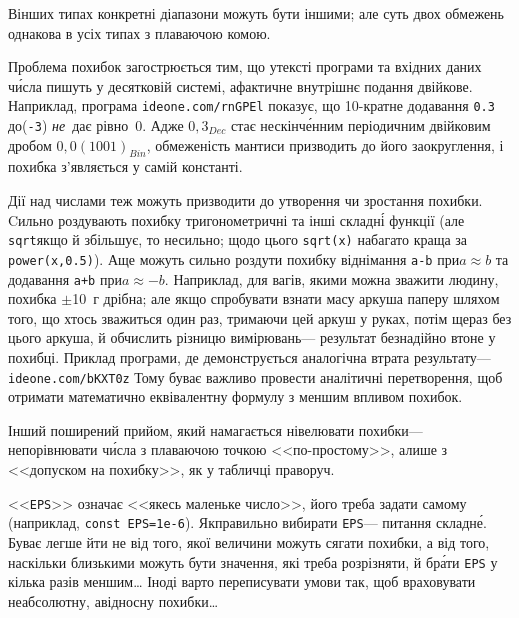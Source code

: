 В\nolinebreak[3] інших типах конкретні діапазони можуть бути іншими; але суть двох обмежень однакова в усіх типах з плаваючою комою. 

Проблема похибок загострюється тим, що у\nolinebreak[3] тексті програми та вхідних даних ч\'{и}сла пишуть у десятковій системі, а\nolinebreak[2] фактичне внутрішнє подання двійкове. 
Наприклад, програма \verb"ideone.com/rnGPEl" показує, що 10-\nolinebreak[2]кратне додавання \texttt{0.3} до\nolinebreak[2] (\texttt{-3}) \emph{не}~дає рівно~0. Адже $0{,}3_{Dec}$ стає нескін\-ч\'{е}н\-ним періодичним двійковим дробом $0{,}0(1001)_{Bin}$, обмеженість мантиси призводить до його заокруглення, і похибка з'являється у самій константі.\label{text:floating-point-error-in-0.3}

Дії над числами теж можуть призводити до утворення чи зростання похибки. Cильно роздувають похибку тригонометричні та інші складн\'{і} функції (але \verb"sqrt"\nolinebreak[1] якщо й збільшує, то не\nolinebreak[3] сильно; щодо цього \verb"sqrt(x)" набагато краща за \verb"power(x,0.5)"). А\nolinebreak[3] ще можуть сильно роздути похибку віднімання \verb"a-b" при\nolinebreak[2] ${a{\approx}b}$ та додавання \verb"a+b" при\nolinebreak[3] ${a{\approx}{-}b}$. Наприклад, для вагів, якими можна зважити людину, похибка $\pm$10~г дрібна; але якщо спробувати взнати масу аркуша паперу шляхом того, що хтось зважиться один раз, тримаючи цей аркуш у руках, потім ще\nolinebreak[3] раз без цього аркуша, й обчислить різницю вимірювань\nolinebreak[3] --- результат безнадійно втоне у похибці.
Приклад програми, де демонструється аналогічна втрата результату\nolinebreak[3] --- \verb"ideone.com/bKXT0z"\hspace{0.5em plus 1em}
Тому буває важливо провести аналітичні перетворення, щоб отримати математично еквівалентну формулу з меншим впливом похибок. 

Інший поширений прийом, який намагається нівелювати похибки\nolinebreak[3] --- не\nolinebreak[2] порівнювати ч\'{и}сла з плаваючою точкою <<по-простому>>, а\nolinebreak[3] лише з <<допуском на похибку>>, як у табличці праворуч.

<<\texttt{EPS}>> означає <<якесь маленьке число>>, його треба задати самому (наприклад, \texttt{const \mbox{EPS=1e-6}}). Як\nolinebreak[3] правильно вибирати \texttt{EPS}\nolinebreak[3] --- питання складн\'{е}. Буває легше йти не від того, якої величини можуть сягати похибки, а від того, наскільки близькими можуть бути значення, які треба розрізняти, й бр\'{а}ти \texttt{EPS} у кілька разів меншим\dots{} Іноді варто переписувати умови так, щоб враховувати не\nolinebreak[3] абсолютну, а\nolinebreak[3] відносну похибки\dots

